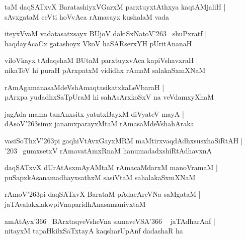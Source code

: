 \documentclass[twoside,12pt,openright]{book}
\def\S{\char'263}
\newcounter{shloka}[chapter]
\begin{document}
\begin{shloka}%
taM daqSATxvX BaratashiyxVGarxM parxtuyxtAthxya kaqtAMjaliH |\\
sAvxgataM ceVti hoVvAca rAmasayx kushalaM vada
\end{shloka}

\begin{shloka}%
iteyxVvaM vadatasatxsayx BUjoV dakiSxNatoV\S ~ shuPxratf |\\
haqdayAcaCx gatashoyx VkoV haSARserxYH pUritAnanaH
\end{shloka}

\begin{shloka}%
viloVkayx tAdaqshaM BUtaM parxtuyxvAca kapiVshavxraH |\\
nikaTeV hi puraH pArxpatxM vididhx rAmaM salakaSxmXNaM 
\end{shloka}

\begin{shloka}%
rAmAgamanasaMdeVshAmaqtasikatxkaLeVbaraH |\\
pArxpa yudadhxSaTpUraM  hi sahAsArxkoSxV na veVdamxyXhaM 
\end{shloka}

\begin{shloka}%
jagAda mama tanAnxsitx yatutxBayxM diVyateV mayA |\\
dAsoV\S simx janamxparayxMtaM rAmasaMdeVshahAraka
\end{shloka}

\begin{shloka}%
vasiSoThxV\S pi gaqhiVtAvxGayxMRM maMtirxvaqdAdhxsusxhaSiRtAH |\\
\char'203 ~gumxsetxV rAmavatAmxRnaM hanumadadxshiRtAdhavxnA 
\end{shloka}

\begin{shloka}%
daqSATxvX dUrAtAsxmAyAMtaM rAmacaMdarxM manoVramaM |\\
puSapxkAsanamadhayxsathxM sasiVtaM sahalakaSxmXNaM
\end{shloka}

\begin{shloka}%
rAmoV\S pi daqSATxvX BarataM pAdacAreVNa saMgataM |\\
jaTAvalakxlakwpiVnaparidhAnasamanivxtaM 
\end{shloka}

\begin{shloka}%
amAtAyx\char'366 ~BArxtaqveVsheVna samaveVSA\char'366 ~ jaTAdharAnf |\\
nitayxM tapaHkilxSaTxtayA kaqsharUpAnf dadashaR ha 
\end{shloka}
\end{document}
